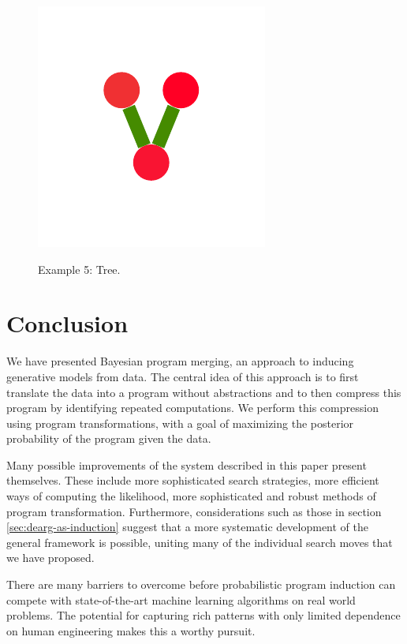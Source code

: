 \documentclass[a4paper,10pt]{article}
\begin{document}
\begin{figure}
{    \includegraphics[scale=.16]{./figures/6-5-tree-induced-19.pdf}    
    \label{fig:exp-tree-induced}    
    }
  \caption{Example 5: Tree.}
  \label{fig:exp-tree}
\end{figure}

\newpage
\section{Conclusion}
We have presented Bayesian program merging, an approach to inducing generative models from data. The central idea of this approach is to first translate the data into a program without abstractions and to then compress this program by identifying repeated computations. We perform this compression using program transformations, with a goal of maximizing the posterior probability of the program given the data.

Many possible improvements of the system described in this paper present themselves. These include more sophisticated search strategies, more efficient ways of computing the likelihood, more sophisticated and robust methods of program transformation.
Furthermore, considerations such as those in section \ref{sec:dearg-as-induction} suggest that a more systematic development of the general framework is possible, uniting many of the individual search moves that we have proposed.

There are many barriers to overcome before probabilistic program induction can compete with state-of-the-art machine learning algorithms on real world problems. The potential for capturing rich patterns with only limited dependence on human engineering makes this a worthy pursuit.

\newpage


\end{document}
